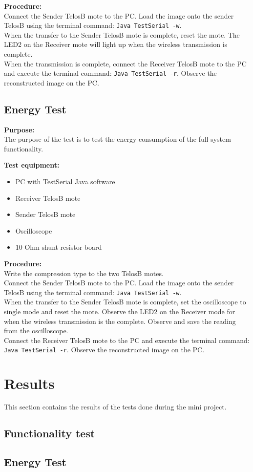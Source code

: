 \textbf{Procedure:}\\
Connect the Sender TelosB mote to the PC. Load the image onto the sender TelosB using the terminal command: \texttt{Java TestSerial -w}.\\
When the transfer to the Sender TelosB mote is complete, reset the mote. 
The LED2 on the Receiver mote will light up when the wireless transmission is complete.\\
When the transmission is complete, connect the Receiver TelosB mote to the PC and execute the terminal command: \texttt{Java TestSerial -r}. 
Observe the reconstructed image on the PC.





\subsection{Energy Test}
\textbf{Purpose:}\\
The purpose of the test is to test the energy consumption of the full system functionality.

\textbf{Test equipment:}
\begin{itemize}
\item PC with TestSerial Java software
\item Receiver TelosB mote
\item Sender TelosB mote
\item Oscilloscope
\item 10 Ohm shunt resistor board
\end{itemize}

\textbf{Procedure:}\\
Write the compression type to the two TelosB motes.\\
Connect the Sender TelosB mote to the PC. Load the image onto the sender TelosB using the terminal command: \texttt{Java TestSerial -w}.\\
When the transfer to the Sender TelosB mote is complete, set the oscilloscope to single mode and reset the mote. Observe the LED2 on the Receiver mode for when the wireless transmission is the complete. Observe and save the reading from the oscilloscope.\\
Connect the Receiver TelosB mote to the PC and execute the terminal command: \texttt{Java TestSerial -r}. Observe the reconstructed image on the PC.


\section{Results}
This section contains the results of the tests done during the mini project.
\subsection{Functionality test}

\subsection{Energy Test}